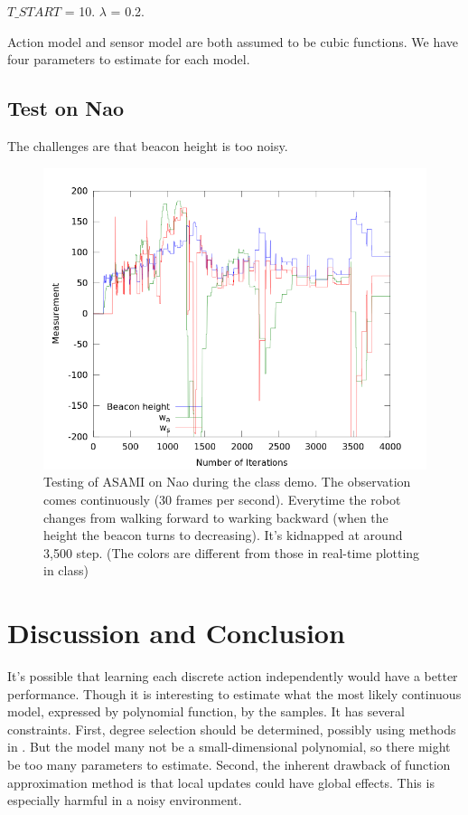 \documentclass[10pt]{IEEEtran}
\begin{document}
$T\_START$ = 10. $\lambda$ = 0.2. 

Action model and sensor model are both assumed to be cubic functions.
We have four parameters to estimate for each model.

\subsection{Test on Nao}

The challenges are that beacon height is too noisy.

\begin{figure}[h]
\centering
\includegraphics[width=\columnwidth]{demoResult.png}
\caption{Testing of ASAMI on Nao during the class demo. The
observation comes continuously (30 frames per second). Everytime the
robot changes from walking forward to warking backward (when the
height the beacon turns to decreasing). It's kidnapped at around 3,500
step.  (The colors are different from those in real-time plotting in
class)}

\label{fig:fuelworld}
\end{figure}


\section{Discussion and Conclusion}
\label{sec:dis}

It's possible that learning each discrete action independently would
have a better performance. Though it is interesting to estimate what
the most likely continuous model, expressed by polynomial function, by
the samples. It has several constraints. First, degree selection
should be determined, possibly using methods in
\cite{IJAIT08-stronger}. But the model many not be a small-dimensional
polynomial, so there might be too many parameters to estimate. Second,
the inherent drawback of function approximation method is that local
updates could have global effects. This is especially harmful in a
noisy environment.




\end{document}
